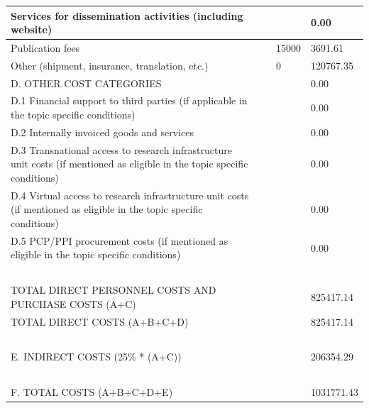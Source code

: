 \begin{table}[H]
\begin{tabular}{|l|l|l|l|}
Services for dissemination activities (including website) & ~ & ~ & 0.00 \\ \hline
Publication fees & ~ & 15000 & 3691.61 \\ \hline
Other (shipment, insurance, translation, etc.) & ~ & 0 & 120767.35 \\ \hline
D. OTHER COST CATEGORIES & ~ & ~ & 0.00\\ \hline
D.1 Financial support to third parties (if applicable in the topic specific conditions) & ~ & ~ & 0.00 \\ \hline
D.2 Internally invoiced goods and services & ~ & ~ & 0.00 \\ \hline
D.3 Transnational access to research infrastructure unit costs (if mentioned as eligible in the topic specific conditions) & ~ & ~ & 0.00 \\ \hline
D.4 Virtual access to research infrastructure unit costs (if mentioned as eligible in the topic specific conditions) & ~ & ~ & 0.00 \\ \hline
D.5 PCP/PPI procurement costs (if mentioned as eligible in the topic specific conditions) & ~ & ~ & 0.00 \\ \hline
~ & ~ & ~ & ~ \\ \hline
TOTAL DIRECT PERSONNEL COSTS AND PURCHASE COSTS (A+C) & ~ & ~ & 825417.14 \\ \hline
TOTAL DIRECT COSTS (A+B+C+D) & ~ & ~ & 825417.14 \\ \hline
~ & ~ & ~ & ~ \\ \hline
E. INDIRECT COSTS (25\% * (A+C)) & ~ & ~ & 206354.29 \\ \hline
~ & ~ & ~ & ~ \\ \hline
F. TOTAL COSTS (A+B+C+D+E) & ~ & ~ & 1031771.43 \\ \hline
\end{tabular}
\end{table}

